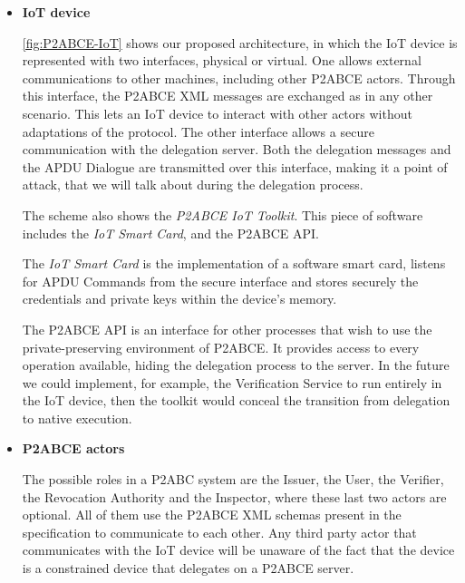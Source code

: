 \begin{itemize}
	
	\item \textbf{IoT device}
	
	\autoref{fig:P2ABCE-IoT} shows our proposed architecture, in which the IoT device is represented with two interfaces, physical or virtual. One allows external communications to other machines, including other P2ABCE actors. Through this interface, the P2ABCE XML messages are exchanged as in any other scenario. This lets an IoT device to interact with other actors without adaptations of the protocol. The other interface allows a secure communication with the delegation server. Both the delegation messages and the APDU Dialogue are transmitted over this interface, making it a point of attack, that we will talk about during the delegation process.
	
	The scheme also shows the \textit{P2ABCE IoT Toolkit}. This piece of software includes the \textit{IoT Smart Card}, and the P2ABCE API.
	
	The \textit{IoT Smart Card} is the implementation of a software smart card, listens for APDU Commands from the secure interface and stores securely the credentials and private keys within the device's memory.
	
	The P2ABCE API is an interface for other processes that wish to use the private-preserving environment of P2ABCE. It provides access to every operation available, hiding the delegation process to the server. In the future we could implement, for example, the Verification Service to run entirely in the IoT device, then the toolkit would conceal the transition from delegation to native execution.
	
	
	\item \textbf{P2ABCE actors}
	
	The possible roles in a P2ABC system are the Issuer, the User, the Verifier, the Revocation Authority and the Inspector, where these last two actors are optional. All of them use the P2ABCE XML schemas present in the specification to communicate to each other. Any third party actor that communicates with the IoT device will be unaware of the fact that the device is a constrained device that delegates on a P2ABCE server.
	

\end{itemize}
